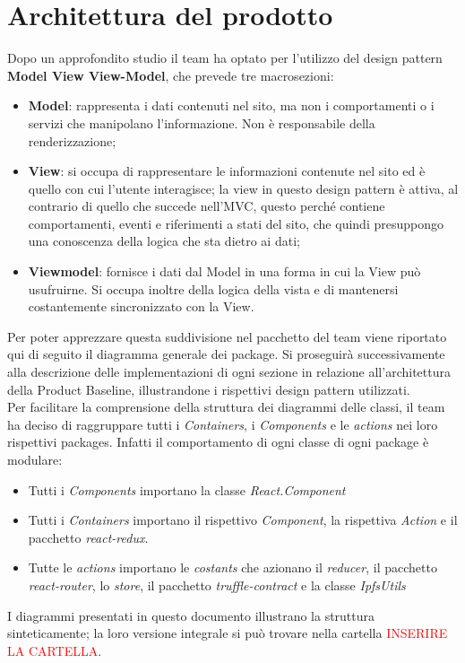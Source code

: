 \section{Architettura del prodotto}
Dopo un approfondito studio il team ha optato per l'utilizzo del design pattern \textbf{Model View View-Model}, che prevede tre macrosezioni:
	\begin{itemize}
		\item \textbf{Model}: rappresenta i dati contenuti nel sito, ma non i comportamenti o i servizi che manipolano l'informazione. Non è responsabile della renderizzazione;
		\item \textbf{View}: si occupa di rappresentare le informazioni contenute nel sito ed è quello con cui l'utente interagisce; la view in questo design pattern è attiva, al contrario di quello che succede nell'MVC, questo perché contiene comportamenti, eventi e riferimenti a stati del sito, che quindi presuppongo una conoscenza della logica che sta dietro ai dati;
		\item \textbf{Viewmodel}: fornisce i dati dal Model in una forma in cui la View può usufruirne. Si occupa inoltre della logica della vista e di mantenersi costantemente sincronizzato con la View.
	\end{itemize}
Per poter apprezzare questa suddivisione nel pacchetto del team viene riportato qui di seguito il diagramma generale dei package. Si proseguirà successivamente alla descrizione delle implementazioni di ogni sezione in relazione all'architettura della Product Baseline, illustrandone i rispettivi design pattern utilizzati.
\\Per facilitare la comprensione della struttura dei diagrammi delle classi, il team ha deciso di raggruppare tutti i \emph{Containers}, i \emph{Components} e le \emph{actions} nei loro rispettivi packages. Infatti il comportamento di ogni classe di ogni package è modulare:
	\begin{itemize}
		\item Tutti i \emph{Components} importano la classe \emph{React.Component}
		\item Tutti i \emph{Containers} importano il rispettivo \emph{Component}, la rispettiva \emph{Action} e il pacchetto \emph{react-redux}.
		\item Tutte le \emph{actions} importano le \emph{costants} che azionano il \emph{reducer}, il pacchetto \emph{react-router}, lo \emph{store}, il pacchetto \emph{truffle-contract} e la classe \emph{IpfsUtils}
	\end{itemize}
I diagrammi presentati in questo documento illustrano la struttura sinteticamente; la loro versione integrale si può trovare nella cartella {\textcolor{red}{INSERIRE LA CARTELLA}}.


